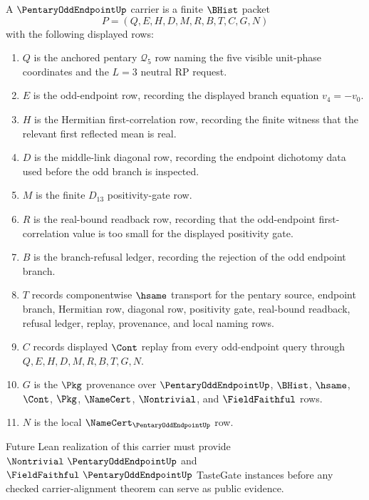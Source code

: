 \begin{definition}
\label{def:pentary-odd-endpoint-carrier}
A $\PentaryOddEndpointUp$ carrier is a finite $\BHist$ packet
$$
P=(Q,E,H,D,M,R,B,T,C,G,N)
$$
with the following displayed rows:
\begin{enumerate}
\item $Q$ is the anchored pentary $\mathcal Q_5$ row naming the five visible unit-phase coordinates and the $L=3$ neutral RP request.
\item $E$ is the odd-endpoint row, recording the displayed branch equation $v_4=-v_0$.
\item $H$ is the Hermitian first-correlation row, recording the finite witness that the relevant first reflected mean is real.
\item $D$ is the middle-link diagonal row, recording the endpoint dichotomy data used before the odd branch is inspected.
\item $M$ is the finite $D_{13}$ positivity-gate row.
\item $R$ is the real-bound readback row, recording that the odd-endpoint first-correlation value is too small for the displayed positivity gate.
\item $B$ is the branch-refusal ledger, recording the rejection of the odd endpoint branch.
\item $T$ records componentwise $\hsame$ transport for the pentary source, endpoint branch, Hermitian row, diagonal row, positivity gate, real-bound readback, refusal ledger, replay, provenance, and local naming rows.
\item $C$ records displayed $\Cont$ replay from every odd-endpoint query through $Q,E,H,D,M,R,B,T,G,N$.
\item $G$ is the $\Pkg$ provenance over $\PentaryOddEndpointUp$, $\BHist$, $\hsame$, $\Cont$, $\Pkg$, $\NameCert$, $\Nontrivial$, and $\FieldFaithful$ rows.
\item $N$ is the local $\NameCert_{\PentaryOddEndpointUp}$ row.
\end{enumerate}
Future Lean realization of this carrier must provide $\Nontrivial\ \PentaryOddEndpointUp$ and $\FieldFaithful\ \PentaryOddEndpointUp$ TasteGate instances before any checked carrier-alignment theorem can serve as public evidence.
\end{definition}

